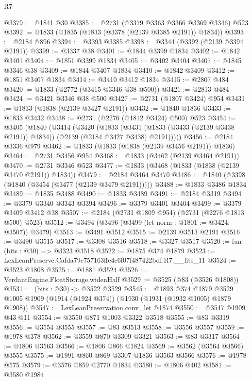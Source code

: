\begin{lexlean}{R7}
\begin{coremodule}
@3379 := @1841 @30
@3385 := @2731 (@3379 @3363 @3366 @3369 @3346) @523
@3392 := @1833 (@1835 (@1833 (@3378 (@2139 @3385 @2191)) @1834))
@3393 := @2184 @896
@3394 := @3393 @3385
@3398 := @3344 (@3392 (@2139 @3394 @2191))
@3399 := @3337 @38
@3401 := @1844 @3399 @1834
@3402 := @1842 @3401
@3404 := @1851 @3399 @1834
@3405 := @3402 @3404
@3407 := @1845 @3346 @38
@3409 := @1844 @3407 @1834
@3410 := @1842 @3409
@3412 := @1851 @3407 @1834
@3414 := @3410 @3412 @1834
@3415 := @2807 @484
@3420 := @1833 (@2772 (@3415 @3346 @38 @500))
@3421 := @2813 @484
@3424 := @3421 @3346 @38 @500
@3427 := @2731 (@1807 @3424) @954
@3431 := @1833 (@1838 (@2139 @3427 @2191))
@3432 := @1840 @1836
@3433 := @1833 @3432
@3438 := @2731 (@2276 (@1812 @3424) @500) @523
@3454 := @3405
    (@1840
      (@3414
        (@3420
          (@1833
            (@3431 (@1833 (@3433 (@2139 @3438 @2191)) @1834))
            (@2139 (@2184 @3427 @3438) @2191)))))
@3456 := @2184 @3336 @979
@3462 := @1833 (@1833 (@1838 (@2139 @3456 @2191)) @1836)
@3464 := @2731 @3456 @954
@3468 := @1833 (@3462 (@2139 @3464 @2191))
@3470 := @2731 @3346 @523
@3477 := @1833 (@3468 (@1833 (@1838 (@2139 @3470 @2191)) @1834))
@3479 := @2184 @3464 @3470
@3486 := @1840 (@3398 (@1840 (@3454 (@3477 (@2139 @3479 @2191)))))
@3488 := @1833 @3486 @1834
@3489 := @1835 @3488
@3490 := @1833 @3489
@3491 := @2184 @3319
@3494 := @3379 @3340 @3343 @3394
@3496 := @3379 @3401 @3404
@3499 := @3379 @3409 @3412 @38
@3507 := @2184 (@2731 @1809 @954) (@2731 (@2276 @1813 @500) @523)
@3512 := @3494 (@3496 (@3499 (let norm : @1801 := @3424; @3507)) @3479)
@3513 := @3491 @3512
@3515 := @2139 @3513 @2191
@3516 := @3490 @3515
@3517 := @3308 @3516
@3518 := @3327 @3517
@3520 := fun (bits : @30) => @3323 @3518
@3522 := @1875 @374 @1879
@3523 := LexLeanPreserve.Cafda79c757163ffe4c6f07f487422bdf.R7.__fits_11
@3524 := @3523 @1808
@3525 := @1881 @3524
@3526 := VerdantEngine.FloatStorage.widenHalf
@3529 := @3525 (@83 (@3526 @1808))
@3531 := (bits : @30) -> @3522 @3529
@3545 := @1893
    @374
    @1879
    @3529
    @1005
    @1909
    (@1914 (@1924 @374))
    (@1930 (@1931 (@1932 @1005) @1879 @1908))
@3547 := LexLeanPreservation.conv_let @1874
@3550 := @3547 @1909 @43 @11
@3554 := @3550 @871 @1003 @3322 @3518
@3555 := @83 @3319
@3556 := @3554 @3555
@3557 := @83 @3513
@3558 := @3556 @3557
@3559 := @1978 @378
@3562 := @3559 @870 @3309 @3321
@3563 := @83 @3317
@3564 := @1806 @3563
@3566 := @1806 @866 @1824
@3569 := @3562 (@3564 @3566) @3555
@3575 := @1991 @860 @869 @3307 @1836 @3563 @3566
@3576 := @1978 @575
@3579 := @3576 @859 @2770 @1834
@3580 := @1806 @402
@3581 := @3580 @1984

\end{coremodule}
\end{lexlean}
